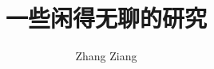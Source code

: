 \documentclass{ctexart}
\begin{document}
\title{\textbf{一些闲得无聊的研究}}
\author{Zhang Ziang} 
\maketitle
\tableofcontents


\newpage


\newpage

\end{document}
